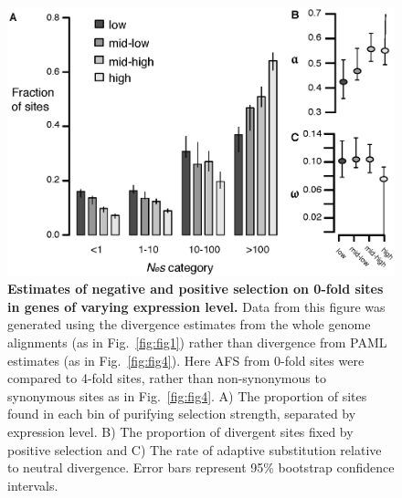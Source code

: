 \begin{figure}[ht!]
      \centering
       \includegraphics[width=\linewidth]{Ch2FigS11}
    \caption{\textbf{Estimates of negative and positive selection on 0-fold sites in genes of varying expression level.} Data from this figure was generated using the divergence estimates from the whole genome alignments (as in Fig.~\ref{fig:fig1}) rather than divergence from PAML estimates (as in Fig.~\ref{fig:fig4}). Here AFS from 0-fold sites were compared to 4-fold sites, rather than non-synonymous to synonymous sites as in Fig.~\ref{fig:fig4}. A) The proportion of sites found in each bin of purifying selection strength, separated by expression level. B) The proportion of divergent sites fixed by positive selection and C) The rate of adaptive substitution relative to neutral divergence. Error bars represent 95\% bootstrap confidence intervals.}
    \label{fig:figS11}
\end{figure}


